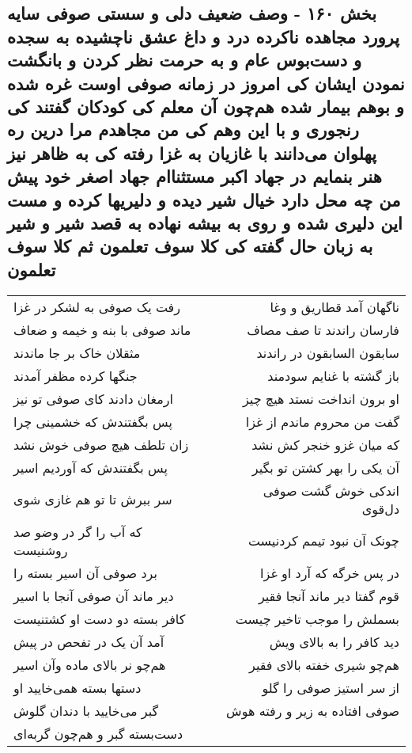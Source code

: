 \begin{center}
\section*{بخش ۱۶۰ - وصف ضعیف دلی و سستی صوفی سایه پرورد مجاهده ناکرده درد و داغ عشق ناچشیده به سجده و دست‌بوس عام و به حرمت نظر کردن و بانگشت نمودن ایشان کی امروز در زمانه صوفی اوست غره شده و بوهم بیمار شده هم‌چون آن معلم کی کودکان گفتند کی رنجوری و با این وهم کی من مجاهدم مرا درین ره پهلوان می‌دانند با غازیان به غزا رفته کی به ظاهر نیز هنر بنمایم در جهاد اکبر مستثناام جهاد اصغر خود پیش من چه محل دارد خیال شیر دیده و دلیریها کرده و مست این دلیری شده و روی به بیشه نهاده به قصد شیر و شیر به زبان حال گفته کی کلا سوف تعلمون ثم کلا سوف تعلمون}
\label{sec:sh160}
\begin{longtable}{l p{0.5cm} r}
رفت یک صوفی به لشکر در غزا
&&
ناگهان آمد قطاریق و وغا
\\
ماند صوفی با بنه و خیمه و ضعاف
&&
فارسان راندند تا صف مصاف
\\
مثقلان خاک بر جا ماندند
&&
سابقون السابقون در راندند
\\
جنگها کرده مظفر آمدند
&&
باز گشته با غنایم سودمند
\\
ارمغان دادند کای صوفی تو نیز
&&
او برون انداخت نستد هیچ چیز
\\
پس بگفتندش که خشمینی چرا
&&
گفت من محروم ماندم از غزا
\\
زان تلطف هیچ صوفی خوش نشد
&&
که میان غزو خنجر کش نشد
\\
پس بگفتندش که آوردیم اسیر
&&
آن یکی را بهر کشتن تو بگیر
\\
سر ببرش تا تو هم غازی شوی
&&
اندکی خوش گشت صوفی دل‌قوی
\\
که آب را گر در وضو صد روشنیست
&&
چونک آن نبود تیمم کردنیست
\\
برد صوفی آن اسیر بسته را
&&
در پس خرگه که آرد او غزا
\\
دیر ماند آن صوفی آنجا با اسیر
&&
قوم گفتا دیر ماند آنجا فقیر
\\
کافر بسته دو دست او کشتنیست
&&
بسملش را موجب تاخیر چیست
\\
آمد آن یک در تفحص در پیش
&&
دید کافر را به بالای ویش
\\
هم‌چو نر بالای ماده وآن اسیر
&&
هم‌چو شیری خفته بالای فقیر
\\
دستها بسته همی‌خایید او
&&
از سر استیز صوفی را گلو
\\
گبر می‌خایید با دندان گلوش
&&
صوفی افتاده به زیر و رفته هوش
\\
دست‌بسته گبر و هم‌چون گربه‌ای

\end{longtable}
\end{center}
